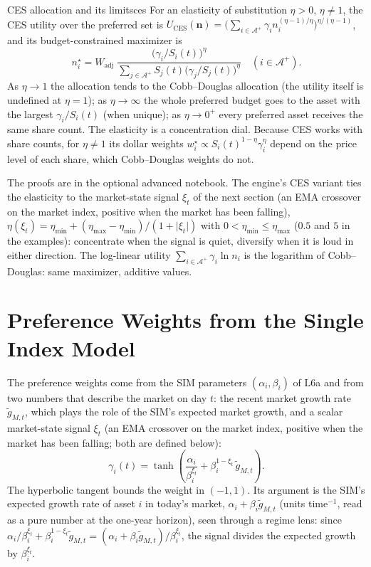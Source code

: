 \documentclass[11pt]{article}
\newcommand{\bn}{\mathbf n}
\newcommand{\Ap}{\mathcal A^{+}}
\newcommand{\Wadj}{W_{\mathrm{adj}}}
\begin{document}
\begin{proposition}{CES allocation and its limits}{ces}
For an elasticity of substitution $\eta>0$, $\eta\ne1$, the CES utility over the preferred set is $U_{\mathrm{CES}}(\bn)=\bigl(\sum_{i\in\Ap}\gamma_i n_i^{(\eta-1)/\eta}\bigr)^{\eta/(\eta-1)}$, and its budget-constrained maximizer is
\begin{equation}
  \label{eq:ces-shares}
  n_i^\star=\Wadj\;\frac{\bigl(\gamma_i/S_i(t)\bigr)^{\eta}}{\sum_{j\in\Ap}S_j(t)\bigl(\gamma_j/S_j(t)\bigr)^{\eta}}\quad(i\in\Ap).
\end{equation}
As $\eta\to1$ the allocation tends to the Cobb--Douglas allocation (the utility itself is undefined at $\eta=1$); as $\eta\to\infty$ the whole preferred budget goes to the asset with the largest $\gamma_i/S_i(t)$ (when unique); as $\eta\to0^+$ every preferred asset receives the same share count. The elasticity is a concentration dial. Because CES works with share counts, for $\eta\ne1$ its dollar weights $w_i^\star\propto S_i(t)^{1-\eta}\gamma_i^\eta$ depend on the price level of each share, which Cobb--Douglas weights do not.
\end{proposition}

The proofs are in the optional advanced notebook. The engine's CES variant ties the elasticity to the market-state signal $\xi_t$ of the next section (an EMA crossover on the market index, positive when the market has been falling), $\eta(\xi_t)=\eta_{\min}+(\eta_{\max}-\eta_{\min})/(1+\lvert\xi_t\rvert)$ with $0<\eta_{\min}\le\eta_{\max}$ ($0.5$ and $5$ in the examples): concentrate when the signal is quiet, diversify when it is loud in either direction. The log-linear utility $\sum_{i\in\Ap}\gamma_i\ln n_i$ is the logarithm of Cobb--Douglas: same maximizer, additive values.

\section{Preference Weights from the Single Index Model}

The preference weights come from the SIM parameters $(\alpha_i,\beta_i)$ of L6a and from two numbers that describe the market on day $t$: the recent market growth rate $\tilde g_{M,t}$, which plays the role of the SIM's expected market growth, and a scalar market-state signal $\xi_t$ (an EMA crossover on the market index, positive when the market has been falling; both are defined below):
\begin{equation}
  \label{eq:preference}
  \gamma_i(t)=\tanh\!\left(\frac{\alpha_i}{\beta_i^{\xi_t}}+\beta_i^{1-\xi_t}\,\tilde g_{M,t}\right).
\end{equation}
The hyperbolic tangent bounds the weight in $(-1,1)$. Its argument is the SIM's expected growth rate of asset $i$ in today's market, $\alpha_i+\beta_i\tilde g_{M,t}$ (units time$^{-1}$, read as a pure number at the one-year horizon), seen through a regime lens: since $\alpha_i/\beta_i^{\xi_t}+\beta_i^{1-\xi_t}\tilde g_{M,t}=(\alpha_i+\beta_i\tilde g_{M,t})/\beta_i^{\xi_t}$, the signal divides the expected growth by $\beta_i^{\xi_t}$.
\end{document}
